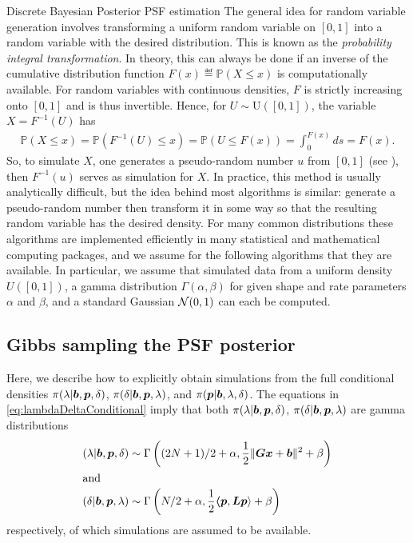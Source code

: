 \begin{chapter}{Discrete Bayesian Posterior PSF estimation}
The general idea for random variable generation involves transforming a uniform random variable on $[0,1]$ into a random variable with the desired distribution.
This is known as the \emph{probability integral transformation}.
In theory, this can always be done if an inverse of the cumulative distribution function $F(x) \eqdef \mathbb P(X \le x)$ is computationally available.
For random variables with continuous densities, $F$ is strictly increasing onto $[0,1]$ and is thus invertible.  
Hence, for $U\sim \mathrm{U([0,1])}$, the variable $X = F^{-1}(U)$ has 
\begin{align}
  \mathbb P( X \le x) = \mathbb P( F^{-1}(U)\le  x ) = \mathbb P( U \le F(x) ) = \int_0^{F(x)}ds = F(x).
\end{align}
So, to simulate $X$, one generates a pseudo-random number $u$ from $[0,1]$ (see \citep{knuthart1981}), then $F^{-1}(u)$ serves as simulation for $X$.
In practice, this method is usually analytically difficult, but the idea behind most algorithms is similar: generate a pseudo-random number then transform it in some way so that the resulting random variable has the desired density.
For many common distributions these algorithms are implemented efficiently in many statistical and mathematical computing packages, and we assume for the following algorithms that they are available.
In particular, we assume that simulated data from a uniform density $U([0,1])$, a gamma distribution $\Gamma(\alpha,\beta)$ for given shape and rate parameters $\alpha$ and $\beta$, and a standard Gaussian $\mathcal{N}(0,1)$ can each be computed.

\subsection{Gibbs sampling the PSF posterior} \label{subsec:gibbs}

Here, we describe how to explicitly obtain simulations from the full conditional densities $\pi(\lambda|\mbox{\boldmath$b$},\mbox{\boldmath$p$},\delta)$, $\pi(\delta|\mbox{\boldmath$b$},\mbox{\boldmath$p$},\lambda)$, and $\pi(\mbox{\boldmath$p$}|\mbox{\boldmath$b$},\lambda,\delta)$.
The equations in \eqref{eq:lambdaDeltaConditional} imply that both $\pi(\lambda|\mbox{\boldmath$b$},\mbox{\boldmath$p$},\delta)$, $\pi(\delta|\mbox{\boldmath$b$},\mbox{\boldmath$p$},\lambda)$ are gamma distributions
\begin{align}
  (\lambda|\mbox{\boldmath$b$},\mbox{\boldmath$p$},\delta) &\sim \Gamma\left((2N+1)/2+\alpha,\frac{1}{2}\|\mbox{\boldmath$Gx$} + \mbox{\boldmath$b$}\|^2 + \beta\right)\\
  \intertext{and}
  (\delta|\mbox{\boldmath$b$},\mbox{\boldmath$p$},\lambda) &\sim \Gamma\left(N/2+\alpha,\frac{1}{2}\mbox{\boldmath$\langle$} \mbox{\boldmath$p$},\mbox{\boldmath$L$}\mbox{\boldmath$p$} \rangle+ \beta\right)
\end{align}
respectively, of which simulations are assumed to be available.


\end{chapter}
